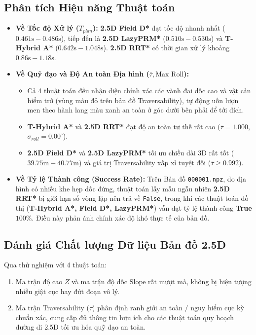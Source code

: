 \documentclass[a4paper,12pt]{article}
\begin{document}
\subsection{Phân tích Hiệu năng Thuật toán}
\begin{itemize}
    \item \textbf{Về Tốc độ Xử lý ($T_{plan}$):} \textbf{2.5D Field D*} đạt tốc độ nhanh nhất ($0.461\text{s} - 0.486\text{s}$), tiếp đến là \textbf{2.5D LazyPRM*} ($0.510\text{s} - 0.530\text{s}$) và \textbf{T-Hybrid A*} ($0.642\text{s} - 1.048\text{s}$). \textbf{2.5D RRT*} có thời gian xử lý khoảng $0.86\text{s} - 1.18\text{s}$.
    \item \textbf{Về Quỹ đạo và Độ An toàn Địa hình ($\bar{\tau}, \text{Max Roll}$):}
    \begin{itemize}
        \item Cả 4 thuật toán đều nhận diện chính xác các vành đai dốc cao và vật cản hiểm trở (vùng màu đỏ trên bản đồ Traversability), tự động uốn lượn men theo hành lang màu xanh an toàn ở góc dưới bên phải để tới đích.
        \item \textbf{T-Hybrid A*} và \textbf{2.5D RRT*} đạt độ an toàn tư thế rất cao ($\bar{\tau} = 1.000$, $\sigma_{roll} = 0.00^\circ$).
        \item \textbf{2.5D Field D*} và \textbf{2.5D LazyPRM*} tối ưu chiều dài 3D rất tốt ($39.75\text{m} - 40.77\text{m}$) và giá trị Traversability xấp xỉ tuyệt đối ($\bar{\tau} \ge 0.992$).
    \end{itemize}
    \item \textbf{Về Tỷ lệ Thành công (Success Rate):} Trên Bản đồ \texttt{000001.npz}, do địa hình có nhiều khe hẹp dốc đứng, thuật toán lấy mẫu ngẫu nhiên \textbf{2.5D RRT*} bị giới hạn số vòng lặp nên trả về \texttt{False}, trong khi các thuật toán đồ thị (\textbf{T-Hybrid A*, Field D*, LazyPRM*}) vẫn đạt tỷ lệ thành công \textbf{True} $100\%$. Điều này phản ánh chính xác độ khó thực tế của bản đồ.
\end{itemize}

\subsection{Đánh giá Chất lượng Dữ liệu Bản đồ 2.5D}
Qua thử nghiệm với 4 thuật toán:
\begin{enumerate}
    \item Ma trận độ cao $Z$ và ma trận độ dốc $\text{Slope}$ rất mượt mà, không bị hiện tượng nhiễu giật cục hay đứt đoạn vô lý.
    \item Ma trận Traversability ($\tau$) phân định ranh giới an toàn / nguy hiểm cực kỳ chuẩn xác, cung cấp đủ thông tin hữu ích cho các thuật toán quy hoạch đường đi 2.5D tối ưu hóa quỹ đạo an toàn.
\end{enumerate}
\end{document}
